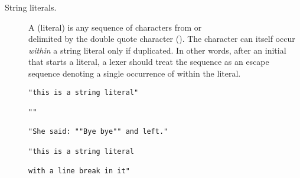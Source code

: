 \begin{description}
\item[String literals.]
%
%
%
%
A  (literal) is any sequence of characters 
from  or \\
delimited by the double quote character  ().
The character  can itself occur \emph{within} a string literal only if
duplicated.
In other words, after an initial  that starts a literal, a lexer should
treat the sequence  as an escape sequence denoting a single occurrence 
of  within the literal.


\begin{lstlisting}[linewidth=23em]
"this is a string literal"

""

"She said: ""Bye bye"" and left."

"this is a string literal

with a line break in it"
\end{lstlisting}


\end{description}
